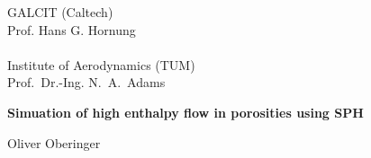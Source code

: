 


% 

\pagestyle{empty}

\begin{center}

\vspace*{-2.8cm}
\begin{minipage}[c]{.30\textwidth}
\end{minipage}
\begin{minipage}[c]{.43\textwidth}
\vspace*{1em}
    {GALCIT (Caltech)\\Prof. Hans G. Hornung \\ \\ Institute of Aerodynamics (TUM) \\ Prof.~Dr.-Ing. N.~A.~Adams}%
\end{minipage}
\begin{minipage}[c]{.25\textwidth}
\end{minipage}

\vspace*{3.3cm}
\begin{minipage}[c]{11cm}
{\LARGE\bf 
Simuation of high enthalpy flow in porosities using SPH}
\end{minipage}

\vspace*{0.8cm}
Oliver Oberinger\\


\end{center}
